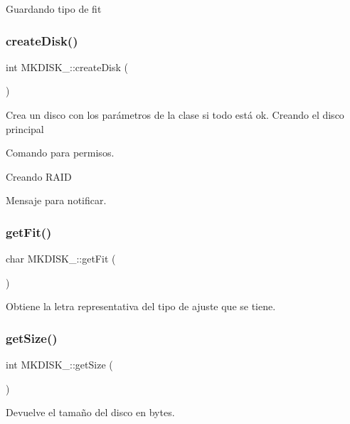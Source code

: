 Guardando tipo de fit \mbox{\label{classMKDISK___a6e61f79331a9d7d64f90791ec4f071c2}} 
\subsubsection{\texorpdfstring{create\+Disk()}{createDisk()}}
{\footnotesize\ttfamily int M\+K\+D\+I\+S\+K\+\_\+\+::create\+Disk (\begin{DoxyParamCaption}{ }\end{DoxyParamCaption})}

Crea un disco con los parámetros de la clase si todo está ok. Creando el disco principal

Comando para permisos.

Creando R\+A\+ID

Mensaje para notificar. \mbox{\label{classMKDISK___a7f632d7a17f80e97a0e4050c29ae95cd}} 
\subsubsection{\texorpdfstring{get\+Fit()}{getFit()}}
{\footnotesize\ttfamily char M\+K\+D\+I\+S\+K\+\_\+\+::get\+Fit (\begin{DoxyParamCaption}{ }\end{DoxyParamCaption})}

Obtiene la letra representativa del tipo de ajuste que se tiene. \mbox{\label{classMKDISK___a2e73ce9adcd4ff071099420917d4585a}} 
\subsubsection{\texorpdfstring{get\+Size()}{getSize()}}
{\footnotesize\ttfamily int M\+K\+D\+I\+S\+K\+\_\+\+::get\+Size (\begin{DoxyParamCaption}{ }\end{DoxyParamCaption})}

Devuelve el tamaño del disco en bytes. \mbox{\label{classMKDISK___a1dd09004e54bd40d98db5edcd7c62f61}} 
